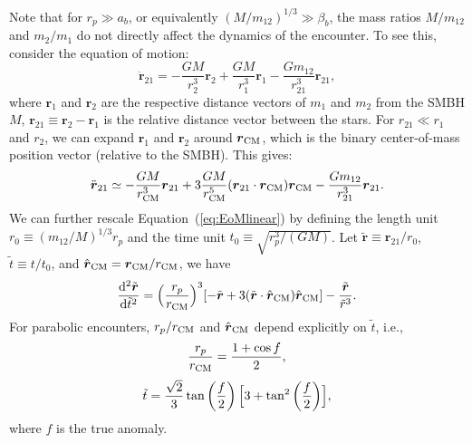 \documentclass[twocolumn]{aastex631}
\begin{document}
Note that for $r_p \gg a_b$, or equivalently $(M/m_{12})^{1/3} \gg \beta_b$, the mass ratios $M/m_{12}$ and $m_2/m_1$ do not directly affect the dynamics of the encounter.
To see this, consider the equation of motion:
\begin{equation}
\ddot{\boldsymbol r}_{21}=-\frac{GM}{r_2^3}{\boldsymbol r_2}+\frac{GM}{r_1^3}{\boldsymbol r_1}-\frac{Gm_{12}}{r_{21}^3}{\boldsymbol r_{21}},
\label{eq:EoM21}
\end{equation}
where ${\boldsymbol r_1}$ and ${\boldsymbol r_2}$ are the respective distance vectors of $m_1$ and $m_2$ from the SMBH $M$,
${\boldsymbol r_{21}\equiv {\boldsymbol r_2}-{\boldsymbol r_1}}$ is the relative distance vector between the stars. 
For $r_{21} \ll r_1$ and $r_2$, we can expand ${\boldsymbol r_1}$ and ${\boldsymbol r_2}$ around ${\boldsymbol r_{\rm CM}}$, which is the binary center-of-mass position vector (relative to the SMBH). 
This gives:
\begin{equation}
\ddot{\boldsymbol r}_{21} \simeq -\frac{GM}{r_{\rm CM}^3}{\boldsymbol r_{21}}+3\frac{GM}{r_{\rm CM}^5}({\boldsymbol r_{21}}\cdot{\boldsymbol r_{\rm CM}}){\boldsymbol r_{\rm CM}}-\frac{Gm_{12}}{r_{21}^3}{\boldsymbol r_{21}}.
\label{eq:EoMlinear}
\end{equation}
We can further rescale Equation~(\ref{eq:EoMlinear}) by defining the length unit $r_0\equiv(m_{12}/M)^{1/3}r_p$ and the time unit $t_0\equiv\sqrt{r_p^3/(GM)}$.
Let $\tilde{\boldsymbol r} \equiv {\boldsymbol r_{21}}/r_0$, ${\tilde t} \equiv t/t_0$, and $\hat{\boldsymbol r}_{\rm CM}={\boldsymbol r}_{\rm CM}/r_{\rm CM}$, we have \citep[cf.][]{Sari2010ApJ}
\begin{equation}
\frac{{\rm d^2} \tilde{\boldsymbol r}}{{\rm d} \tilde{t}^2}=\Bigl(\frac{r_p}{r_{\rm CM}}\Bigr)^3[-\tilde{\boldsymbol r}+3(\tilde{\boldsymbol r}\cdot\hat{\boldsymbol r}_{\rm CM})\hat{\boldsymbol r}_{\rm CM}]-\frac{\tilde{\boldsymbol r}}{\tilde{r}^3}.
\label{eq:EoMscaling}
\end{equation}
For parabolic encounters, $r_p/r_{\rm CM}$ and $\hat{\boldsymbol r}_{\rm CM}$ depend explicitly on $\tilde{t}$, i.e.,
\begin{equation}
    \frac{r_p}{r_{\rm CM}}=\frac{1+\cos f}{2},
\label{eq:rCM}
\end{equation}
\begin{equation}
    \tilde{t}=\frac{\sqrt{2}}{3} \tan \left ( \frac{f}{2} \right ) \Bigl[ 3+\tan^2 \left (\frac{f}{2} \right ) \Bigr],
\label{eq:ttof}
\end{equation}
where $f$ is the true anomaly.
\end{document}
